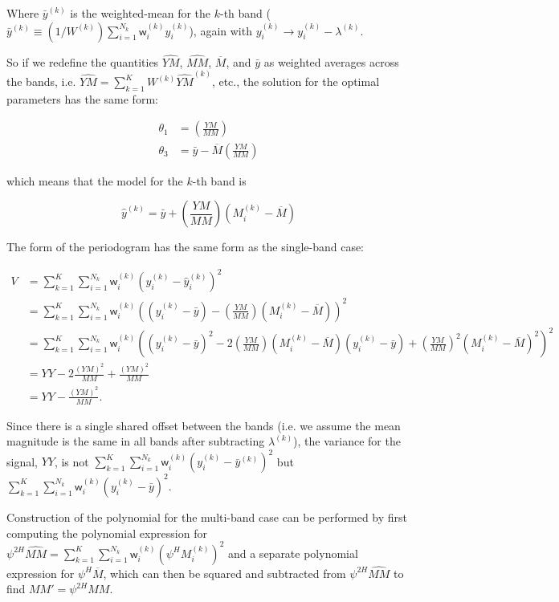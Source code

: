 \documentclass[apj]{emulateapj}
\newcommand{\wgt}{\mathsf{w}}  %
\newcommand{\MMhat}{\widehat{MM}}
\newcommand{\YMhat}{\widehat{YM}}
\newcommand{\Mbar}{\overline{M}}
\newcommand{\ybar}{\bar{y}}
\newcommand{\Mk}[1][k]{M^{(k)}}
\newcommand{\YMh}[1][k]{\YMhat^{(#1)}}
\newcommand{\yb}[1][k]{\ybar^{(#1)}}
\newcommand{\wk}[1][k]{\wgt^{(#1)}}
\newcommand{\yhk}[1][k]{\hat{y}^{(#1)}}
\newcommand{\yk}[1][k]{y^{(#1)}}
\newcommand{\lk}[1][k]{\lambda^{(#1)}}
\newcommand{\Wtk}[1][k]{W^{(#1)}}
\newcommand{\eith}{\psi}
\begin{document}
\begin{appendix}
Where $\yb$ is the weighted-mean for the $k$-th band ($\yb \equiv (1/\Wtk)\sum_{i=1}^{N_k}\wk_i\yk_i$), again with $\yk_i \rightarrow \yk_i - \lk$.

So if we redefine the quantities $\YMhat$, $\MMhat$, $\Mbar$, and $\bar{y}$ as weighted averages across the bands, i.e. $\YMhat = \sum_{k=1}^K \Wtk \YMh$, etc., the solution for the optimal parameters has the same form:

\begin{align}
\theta_1 &= \left(\frac{YM}{MM}\right)\\
\theta_3 &= \bar{y} - \Mbar\left(\frac{YM}{MM}\right)
\end{align}

which means that the model for the $k$-th band is

\begin{equation}
\yhk = \bar{y} + \left(\frac{YM}{MM}\right)\left(M^{(k)}_i - \Mbar\right)
\end{equation}

The form of the periodogram has the same form as the single-band case:

\begin{align}
V &=\sum_{k=1}^{K}\sum_{i=1}^{N_k}\wk_i \left(\yk_i - \yhk_i\right)^2\\
       &=\sum_{k=1}^{K}\sum_{i=1}^{N_k}\wk_i \left((\yk_i - \bar{y}) - \left(\frac{YM}{MM}\right)(M_i^{(k)} - \Mbar)\right)^2\\
       &=\sum_{k=1}^{K}\sum_{i=1}^{N_k}\wk_i \left((\yk_i - \bar{y})^2 - 2\left(\frac{YM}{MM}\right)(M_i^{(k)} - \Mbar)(\yk_i - \bar{y}) + \left(\frac{YM}{MM}\right)^2(M_i^{(k)} - \Mbar)^2\right)^2\\
       &=YY - 2\frac{(YM)^2}{MM} + \frac{(YM)^2}{MM}\\
       &=YY - \frac{(YM)^2}{MM}.
\end{align}

Since there is a single shared offset between the bands (i.e. we assume the mean magnitude is the same in all bands after subtracting $\lk$), the variance for the signal, $YY$, is not $\sum_{k=1}^{K}\sum_{i=1}^{N_k}\wk_i (\yk_i - \yb)^2$ but $\sum_{k=1}^{K}\sum_{i=1}^{N_k}\wk_i (\yk_i - \bar{y})^2$.

Construction of the polynomial for the multi-band case can be performed by first computing the polynomial expression for $\eith^{2H}\MMhat = \sum_{k=1}^{K}\sum_{i=1}^{N_k}\wk_i \left(\eith^{H}\Mk_i\right)^2$ and a separate polynomial expression for $\psi^H\Mbar$, which can then be squared and subtracted from $\psi^{2H}\MMhat$ to find $MM' = \eith^{2H}MM$.


\end{appendix}
\end{document}
